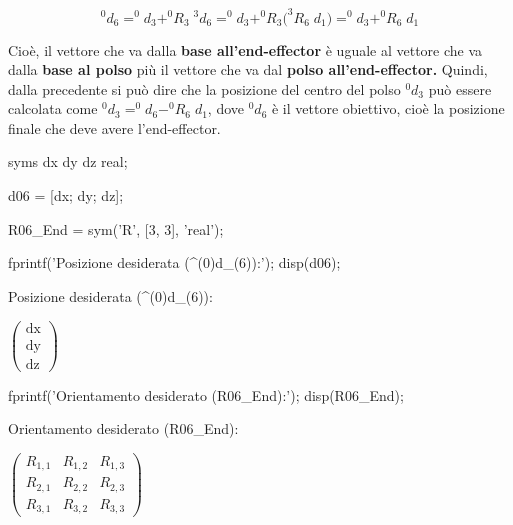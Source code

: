 \documentclass[11pt, a4paper]{article}
\begin{document}
\[
    ^0 d_6 =^0 d_3 +^0 R_3 \;^3 d_6 =^0 d_3 +^0 R_3 \bigl(^3 R_6 \;d_1 \bigr)=^0 d_3 +^0 R_6 \;d_1
\]

\begin{par}
\begin{flushleft}
Cioè, il vettore che va dalla \textbf{base all'end-effector} è uguale al vettore che va dalla \textbf{base al polso} più il vettore che va dal \textbf{polso all'end-effector.} Quindi, dalla precedente si può dire che la posizione del centro del polso $^0 d_3$ può essere calcolata come $^0 d_3 =^0 d_6 -^0 R_6 \;d_1$, dove $^0 d_6$ è il vettore obiettivo, cioè la posizione finale che deve avere l'end-effector.
\end{flushleft}
\end{par}

\begin{matlabcode}
syms dx dy dz real;

d06 = [dx; dy; dz];

R06_End = sym('R', [3, 3], 'real');

fprintf('Posizione desiderata (^(0)d_(6)):');
disp(d06);
\end{matlabcode}
\begin{matlaboutput}
Posizione desiderata (^(0)d_(6)):
\end{matlaboutput}
\begin{matlabsymbolicoutput}
$\displaystyle \left(\begin{array}{c}
\textrm{dx}\\
\textrm{dy}\\
\textrm{dz}
\end{array}\right)$
\end{matlabsymbolicoutput}
\begin{matlabcode}
fprintf('Orientamento desiderato (R06_End):');
disp(R06_End);
\end{matlabcode}
\begin{matlaboutput}
Orientamento desiderato (R06_End):
\end{matlaboutput}
\begin{matlabsymbolicoutput}
$\displaystyle \left(\begin{array}{ccc}
R_{1,1}  & R_{1,2}  & R_{1,3} \\
R_{2,1}  & R_{2,2}  & R_{2,3} \\
R_{3,1}  & R_{3,2}  & R_{3,3}
\end{array}\right)$
\end{matlabsymbolicoutput}
\end{document}
